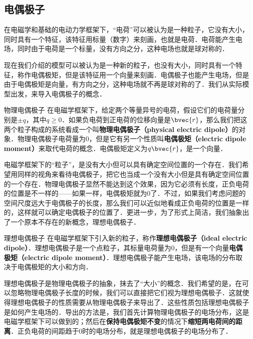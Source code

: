 


\subsection{电偶极子}

在电磁学和基础的电动力学框架下，“电荷”可以被认为是一种粒子，它没有大小，同时具有一个特征，该特征用标量（数字）来刻画，也就是电荷．电荷能产生电场，同时由于电荷是一个标量，没有方向之分，这种电场也就是球对称的．

现在我们介绍的模型可以被认为是一种新的粒子，也没有大小，同时具有一个特征，称作电偶极矩，但是该特征用一个向量来刻画．电偶极子也能产生电场，但是由于电偶极矩是向量，有方向之分，这种电场就不再是球对称的了．我们从实际模型出发，来导入电偶极子的概念．

\begin{definition}{物理电偶极子}
在电磁学框架下，给定两个等量异号的电荷，假设它们的电荷量分别是$\pm q$，其中$q\geq 0$．如果负电荷到正电荷的位移向量是$\bvec{r}$，那么我们把这两个粒子构成的系统看成一个叫\textbf{物理电偶极子（physical electric dipole）}的对象．物理电偶极子电荷量为$0$，但是它有另一个性质叫\textbf{电偶极矩（electric dipole moment）}来取代电荷的概念．电偶极矩定义为$q\bvec{r}$，是一个向量．
\end{definition}

电磁学框架下的“粒子”，是没有大小但可以具有确定空间位置的一个存在．我们希望用同样的视角来看待电偶极子，把它也当成一个没有大小但是具有确定空间位置的一个存在．物理电偶极子显然不能达到这个效果，因为它必须有长度，正负电荷的位置是不一样的——如果一样，电偶极矩就为$0$了．不过，如果我们考虑问题的空间尺度远大于电偶极子的长度，那么我们可以近似地看成正负电荷的位置是一样的，这样就可以确定电偶极子的位置了．更进一步，为了形式上简洁，我们抽象出了一个原本不存在的新概念，理想电偶极子．

\begin{definition}{理想电偶极子}
在电磁学框架下引入新的粒子，称作\textbf{理想电偶极子（ideal electric dipole）}．理想电偶极子是一个点粒子，其标量电荷量为$0$，但是有一个向量\textbf{电偶极矩（electric dipole moment）}．理想电偶极子能产生电场，该电场的分布取决于电偶极矩的大小和方向．
\end{definition}

理想电偶极子是物理电偶极子的抽象，抹去了“大小”的概念．我们希望的是，在可以忽略物理电偶极子长度的时候，我们可以直接把它们视为理想电偶极子．这就使得理想电偶极子的性质需要从物理电偶极子来导出了．这些性质包括理想电偶极子是如何产生电场的．导出的方法是，我们首先计算物理电偶极子的电场分布，这是电磁学框架下可以做到的；然后在\textbf{保持电偶极矩不变}的情况下\textbf{缩短两电荷间的距离}．正负电荷的间距趋于$0$时的电场分布，就是理想电偶极子的电场分布了．

